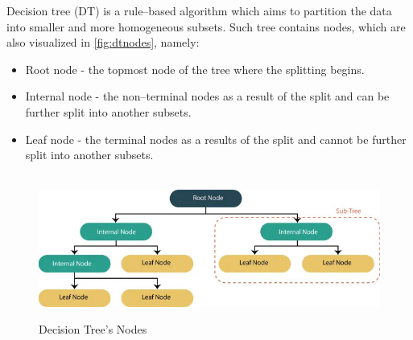 Decision tree (DT) is a rule--based algorithm which aims to partition the data into smaller and more homogeneous subsets. Such tree contains nodes, which are also visualized in \autoref{fig:dtnodes}, namely:
\begin{itemize}\setlength\itemsep{0em}
	\item Root node - the topmost node of the tree where the splitting begins.
	\item Internal node - the non--terminal nodes as a result of the split and can be further split into another subsets.
	\item Leaf node - the terminal nodes as a results of the split and cannot be further split into another subsets.
\end{itemize}
\begin{figure}[H]
    \centering
    \caption{Decision Tree's Nodes}\vspace{0.5em}
    \label{fig:dtnodes}\
    \includegraphics[width=130mm]{Figures/dtnodes.jpg}
    \vspace{-1em}
\end{figure}

